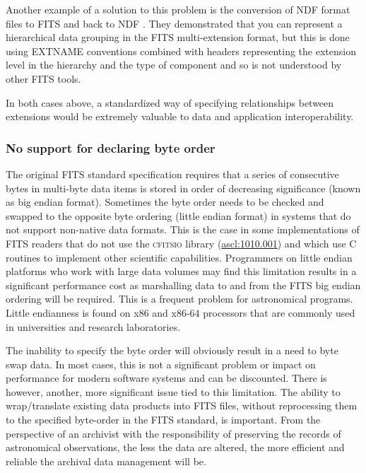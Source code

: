 \documentclass[final,authoryear,5p,times,twocolumn]{elsarticle}
\begin{document}
{{Another example of a solution to this problem is the conversion of NDF 
format files to FITS and back to NDF \citep{SUN55,1997STARB..19...14C}.
They demonstrated that you can represent a hierarchical data grouping 
in the FITS multi-extension format, but this is done using EXTNAME 
conventions combined with headers representing the extension level in 
the hierarchy and the type of component and so is not understood by 
other FITS tools. 

In both cases above, a standardized way of specifying relationships 
between extensions would be extremely valuable to data and application interoperability.


\subsubsection{No support for declaring byte order}
\label{section_byte_order}

The original FITS standard specification \citep{1981A&AS...44..363W}
requires that a series of consecutive bytes in multi-byte data items is
stored in order of decreasing significance (known as big endian format).
Sometimes the byte order needs to be checked and swapped to the opposite
byte ordering (little endian format) in systems that do not support
non-native data formats.  This is the case in some implementations of FITS
readers that do not use the \textsc{cfitsio} library
(\href{http://ascl.net/1010.001}{ascl:1010.001}) and which use C routines
to implement other scientific capabilities.  Programmers on little endian
platforms who work with large data volumes may find this limitation
results in a significant performance cost as marshalling data to and from
the FITS big endian ordering will be required.  This is a frequent problem
for astronomical programs. Little endianness is found on x86 and x86-64
processors that are commonly used in universities and research
laboratories.


The inability to specify the byte order will obviously result in a 
need to byte swap data. In most cases, this is not a significant
problem or impact on performance for modern software systems and
can be discounted. There is however, another, more significant issue
tied to this limitation. The ability to wrap/translate existing data products 
into FITS files, without reprocessing them to the specified
byte-order in the FITS standard, is important. From
the perspective of an archivist with the responsibility of preserving the
records of astronomical observations, the less the data are altered, the
more efficient and reliable the archival data management will be.


}}
\end{document}
